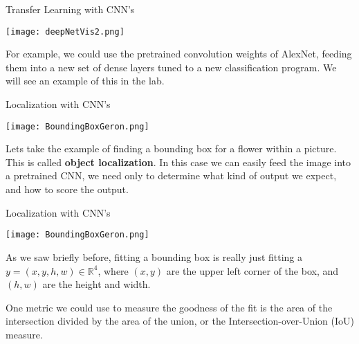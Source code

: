 \documentclass[10pt, table, dvipsnames,xcdraw, handout]{beamer}
\begin{document}
\begin{frame}[fragile]{Transfer Learning with CNN's}
  \begin{minipage}[t][0.4\textheight][t]{\textwidth}\centering
	\centering \texttt{[image: deepNetVis2.png]}
  \end{minipage}
  \vfill
\begin{minipage}[t][0.6\textheight][t]{\textwidth}
For example, we could use the pretrained convolution weights of AlexNet, feeding them into a new set of dense layers tuned to a new classification program. We will see an example of this in the lab. 
\end{minipage}
\end{frame}





\begin{frame}[fragile]{Localization with CNN's}
  \begin{minipage}[t][0.4\textheight][t]{\textwidth}\centering
	\centering \texttt{[image: BoundingBoxGeron.png]}
  \end{minipage}
  \vfill
\begin{minipage}[t][0.6\textheight][t]{\textwidth}
Lets take the example of finding a bounding box for a flower within a picture. This is called \textbf{object localization}. In this case we can easily feed the image into a pretrained CNN, we need only to determine what kind of output we expect, and how to score the output. 
\end{minipage}
\end{frame}


\begin{frame}[fragile]{Localization with CNN's}
  \begin{minipage}[t][0.4\textheight][t]{\textwidth}\centering
	\centering \texttt{[image: BoundingBoxGeron.png]}
  \end{minipage}
  \vfill
\begin{minipage}[t][0.6\textheight][t]{\textwidth}
As we saw briefly before, fitting a bounding box is really just fitting a $y = (x,y,h,w)\in \mathbb{R}^4$, where  $(x,y)$ are the upper left corner of the box, and $(h,w)$ are the height and width.  \pause

One metric we could use to measure the goodness of the fit is the area of the intersection divided by the area of the union, or the Intersection-over-Union (IoU) measure. 
\end{minipage}
\end{frame}
\end{document}

